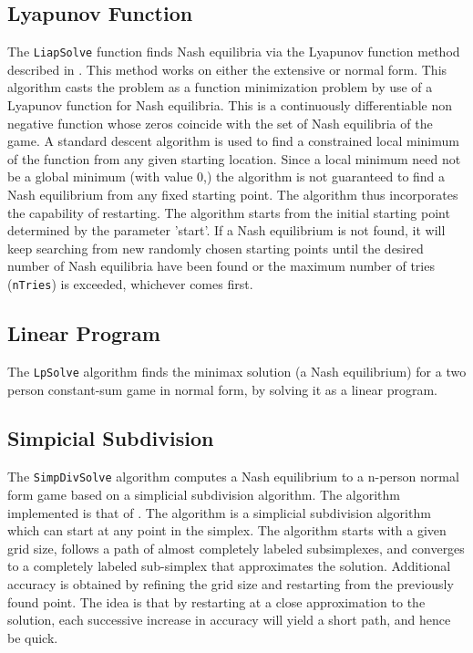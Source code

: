 \subsection{Lyapunov Function}

The \texttt{LiapSolve} function finds Nash equilibria via the Lyapunov
function method described in \cite{McK:91}.  This method works on
either the extensive or normal form.  This algorithm casts the problem
as a function minimization problem by use of a Lyapunov function for
Nash equilibria.  This is a continuously differentiable non negative
function whose zeros coincide with the set of Nash equilibria of the
game.  A standard descent algorithm is used to find a constrained
local minimum of the function from any given starting location.  Since
a local minimum need not be a global minimum (with value 0,) the
algorithm is not guaranteed to find a Nash equilibrium from any fixed
starting point.  The algorithm thus incorporates the capability of
restarting.  The algorithm starts from the initial starting point
determined by the parameter 'start'.  If a Nash equilibrium is not
found, it will keep searching from new randomly chosen starting points
until the desired number of Nash equilibria have been found or the
maximum number of tries (\verb+nTries+) is exceeded, whichever
comes first.

\subsection{Linear Program}

The \texttt{LpSolve} algorithm finds the minimax solution (a Nash
equilibrium) for a two person constant-sum game in normal form, by
solving it as a linear program.

\subsection{Simpicial Subdivision}

The \texttt{SimpDivSolve} algorithm computes a Nash equilibrium to a
n-person normal form game based on a simplicial subdivision algorithm.
The algorithm implemented is that of \cite{VTH:1987}.  The algorithm
is a simplicial subdivision algorithm which can start at any point in
the simplex.  The algorithm starts with a given grid size, follows a
path of almost completely labeled subsimplexes, and converges to a
completely labeled sub-simplex that approximates the solution.
Additional accuracy is obtained by refining the grid size and
restarting from the previously found point.  The idea is that by
restarting at a close approximation to the solution, each successive
increase in accuracy will yield a short path, and hence be quick.

